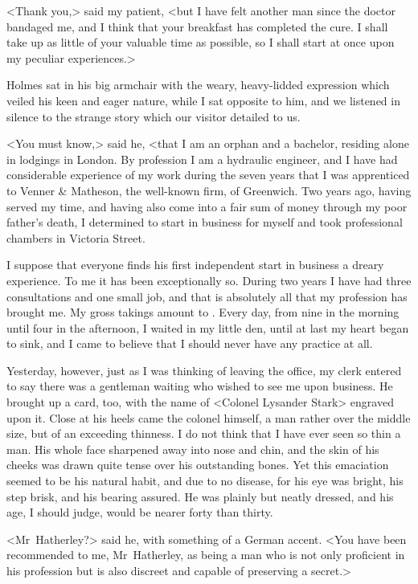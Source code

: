 <Thank you,> said my patient, <but I have felt another man since the doctor bandaged me, and I think that your breakfast has completed the cure. I shall take up as little of your valuable time as possible, so I shall start at once upon my peculiar experiences.>

Holmes sat in his big armchair with the weary, heavy-lidded expression which veiled his keen and eager nature, while I sat opposite to him, and we listened in silence to the strange story which our visitor detailed to us.

<You must know,> said he, <that I am an orphan and a bachelor, residing alone in lodgings in London. By profession I am a hydraulic engineer, and I have had considerable experience of my work during the seven years that I was apprenticed to Venner \& Matheson, the well-known firm, of Greenwich. Two years ago, having served my time, and having also come into a fair sum of money through my poor father's death, I determined to start in business for myself and took professional chambers in Victoria Street.

I suppose that everyone finds his first independent start in business a dreary experience. To me it has been exceptionally so. During two years I have had three consultations and one small job, and that is absolutely all that my profession has brought me. My gross takings amount to . Every day, from nine in the morning until four in the afternoon, I waited in my little den, until at last my heart began to sink, and I came to believe that I should never have any practice at all.

Yesterday, however, just as I was thinking of leaving the office, my clerk entered to say there was a gentleman waiting who wished to see me upon business. He brought up a card, too, with the name of <Colonel Lysander Stark> engraved upon it. Close at his heels came the colonel himself, a man rather over the middle size, but of an exceeding thinness. I do not think that I have ever seen so thin a man. His whole face sharpened away into nose and chin, and the skin of his cheeks was drawn quite tense over his outstanding bones. Yet this emaciation seemed to be his natural habit, and due to no disease, for his eye was bright, his step brisk, and his bearing assured. He was plainly but neatly dressed, and his age, I should judge, would be nearer forty than thirty.

<Mr~Hatherley?> said he, with something of a German accent. <You have been recommended to me, Mr~Hatherley, as being a man who is not only proficient in his profession but is also discreet and capable of preserving a secret.>

